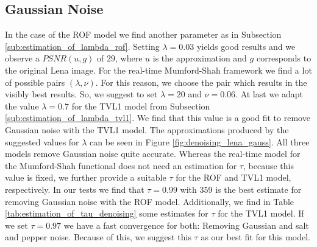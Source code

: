 \documentclass[abstracton]{scrreprt}
\begin{document}
        \subsection{Gaussian Noise} %
        \label{sub:gaussian_noise}
            In the case of the ROF model we find another parameter as in Subsection \ref{sub:estimation_of_lambda_rof}. Setting $\lambda = 0.03$ yields good results and we observe a $PSNR(u, g)$ of $29$, where $u$ is the approximation and $g$ corresponds to the original Lena image. For the real-time Mumford-Shah framework we find a lot of possible pairs $(\lambda, \nu)$. For this reason, we choose the pair which results in the visibly best results. So, we suggest to set $\lambda = 20$ and $\nu = 0.06$. At last we adapt the value $\lambda = 0.7$ for the TVL1 model from Subsection \ref{sub:estimation_of_lambda_tvl1}. We find that this value is a good fit to remove Gaussian noise with the TVL1 model. The approximations produced by the suggested values for $\lambda$ can be seen in Figure \ref{fig:denoising_lena_gauss}. All three models remove Gaussian noise quite accurate. Whereas the real-time model for the Mumford-Shah functional does not need an estimation for $\tau$, because this value is fixed, we further provide a suitable $\tau$ for the ROF and TVL1 model, respectively. In our tests we find that $\tau = 0.99$ with $359$ is the best estimate for removing Gaussian noise with the ROF model. Additionally, we find in Table \ref{tab:estimation_of_tau_denoising} some estimates for $\tau$ for the TVL1 model. If we set $\tau = 0.97$ we have a fast convergence for both: Removing Gaussian and salt and pepper noise. Because of this, we suggest this $\tau$ as our best fit for this model.
\end{document}
